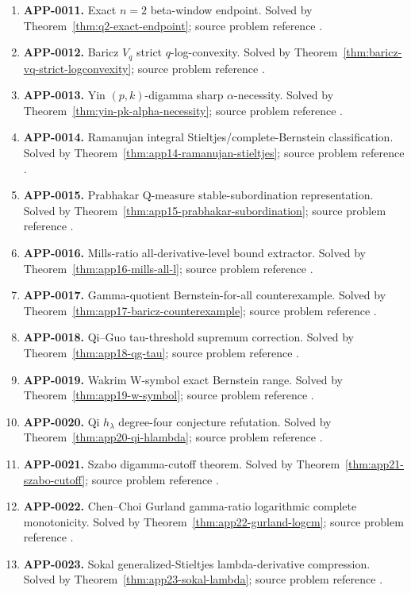 \documentclass[11pt]{article}
\numberwithin{equation}{section}
\theoremstyle{definition}
\theoremstyle{remark}
\newcommand{\1}{\mathbf 1}
\begin{document}
\begin{enumerate}
\item \textbf{APP-0011.} Exact \(n=2\) beta-window endpoint.  Solved by Theorem~\ref{thm:q2-exact-endpoint}; source problem reference \cite{qi-lim-nantomah-polygamma}.
\item \textbf{APP-0012.} Baricz \(V_q\) strict \(q\)-log-convexity.  Solved by Theorem~\ref{thm:baricz-vq-strict-logconvexity}; source problem reference \cite{baricz-turan-thesis}.
\item \textbf{APP-0013.} Yin \((p,k)\)-digamma sharp \(\alpha\)-necessity.  Solved by Theorem~\ref{thm:yin-pk-alpha-necessity}; source problem reference \cite{yin-pk-digamma}.
\item \textbf{APP-0014.} Ramanujan integral Stieltjes/complete-Bernstein classification.  Solved by Theorem~\ref{thm:app14-ramanujan-stieltjes}; source problem reference \cite{mishra-swaminathan-ramanujan}.
\item \textbf{APP-0015.} Prabhakar Q-measure stable-subordination representation.  Solved by Theorem~\ref{thm:app15-prabhakar-subordination}; source problem reference \cite{sibisi-prabhakar}.
\item \textbf{APP-0016.} Mills-ratio all-derivative-level bound extractor.  Solved by Theorem~\ref{thm:app16-mills-all-l}; source problem reference \cite{from-mills}.
\item \textbf{APP-0017.} Gamma-quotient Bernstein-for-all counterexample.  Solved by Theorem~\ref{thm:app17-baricz-counterexample}; source problem reference \cite{baricz-turan}.
\item \textbf{APP-0018.} Qi--Guo tau-threshold supremum correction.  Solved by Theorem~\ref{thm:app18-qg-tau}; source problem reference \cite{qi-guo-2004}.
\item \textbf{APP-0019.} Wakrim W-symbol exact Bernstein range.  Solved by Theorem~\ref{thm:app19-w-symbol}; source problem reference \cite{wakrim-w}.
\item \textbf{APP-0020.} Qi \(h_\lambda\) degree-four conjecture refutation.  Solved by Theorem~\ref{thm:app20-qi-hlambda}; source problem reference \cite{qi-hlambda}.
\item \textbf{APP-0021.} Szabo digamma-cutoff theorem.  Solved by Theorem~\ref{thm:app21-szabo-cutoff}; source problem reference \cite{szabo-cm}.
\item \textbf{APP-0022.} Chen--Choi Gurland gamma-ratio logarithmic complete monotonicity.  Solved by Theorem~\ref{thm:app22-gurland-logcm}; source problem reference \cite{chen-choi-gurland}.
\item \textbf{APP-0023.} Sokal generalized-Stieltjes lambda-derivative compression.  Solved by Theorem~\ref{thm:app23-sokal-lambda}; source problem reference \cite{sokal-gs}.

\end{enumerate}
\end{document}

